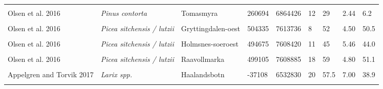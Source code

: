 \documentclass[
]{article}
\begin{document}
\begin{landscape}
\begin{longtable}[t]{l>{}llllllll}
\cellcolor{gray!6}{Olsen et al. 2016} & \em{\cellcolor{gray!6}{Pinus contorta}} & \cellcolor{gray!6}{Sollitangen} & \cellcolor{gray!6}{260896} & \cellcolor{gray!6}{6859024} & \cellcolor{gray!6}{12} & \cellcolor{gray!6}{37} & \cellcolor{gray!6}{2.60} & \cellcolor{gray!6}{6.7}\\
\addlinespace
Olsen et al. 2016 & \em{Pinus contorta} & Tomasmyra & 260694 & 6864426 & 12 & 29 & 2.44 & 6.2\\
\cellcolor{gray!6}{Olsen et al. 2016} & \em{\cellcolor{gray!6}{Picea sitchensis / lutzii}} & \cellcolor{gray!6}{Gryttingdalen-vest} & \cellcolor{gray!6}{503887} & \cellcolor{gray!6}{7613803} & \cellcolor{gray!6}{8} & \cellcolor{gray!6}{52} & \cellcolor{gray!6}{4.56} & \cellcolor{gray!6}{49.0}\\
Olsen et al. 2016 & \em{Picea sitchensis / lutzii} & Gryttingdalen-oest & 504335 & 7613736 & 8 & 52 & 4.50 & 50.5\\
\cellcolor{gray!6}{Olsen et al. 2016} & \em{\cellcolor{gray!6}{Picea sitchensis / lutzii}} & \cellcolor{gray!6}{Holmsnes-nordvest} & \cellcolor{gray!6}{493935} & \cellcolor{gray!6}{7609464} & \cellcolor{gray!6}{11} & \cellcolor{gray!6}{49} & \cellcolor{gray!6}{5.36} & \cellcolor{gray!6}{45.3}\\
Olsen et al. 2016 & \em{Picea sitchensis / lutzii} & Holmsnes-soeroest & 494675 & 7608420 & 11 & 45 & 5.46 & 44.0\\
\addlinespace
\cellcolor{gray!6}{Olsen et al. 2016} & \em{\cellcolor{gray!6}{Picea sitchensis / lutzii}} & \cellcolor{gray!6}{Hov} & \cellcolor{gray!6}{496920} & \cellcolor{gray!6}{7608739} & \cellcolor{gray!6}{11} & \cellcolor{gray!6}{56} & \cellcolor{gray!6}{5.22} & \cellcolor{gray!6}{50.9}\\
Olsen et al. 2016 & \em{Picea sitchensis / lutzii} & Raavollmarka & 499105 & 7608885 & 18 & 59 & 4.80 & 51.1\\
\cellcolor{gray!6}{Appelgren and Torvik 2017} & \em{\cellcolor{gray!6}{Larix spp.}} & \cellcolor{gray!6}{Anisdal} & \cellcolor{gray!6}{-36439} & \cellcolor{gray!6}{6529890} & \cellcolor{gray!6}{22} & \cellcolor{gray!6}{56} & \cellcolor{gray!6}{7.37} & \cellcolor{gray!6}{38.8}\\
Appelgren and Torvik 2017 & \em{Larix spp.} & Haalandsbotn & -37108 & 6532830 & 20 & 57.5 & 7.00 & 38.9\\
\cellcolor{gray!6}{Appelgren and Torvik 2017} & \em{\cellcolor{gray!6}{Larix spp.}} & \cellcolor{gray!6}{Roeynaasen} & \cellcolor{gray!6}{-31279} & \cellcolor{gray!6}{6547997} & \cellcolor{gray!6}{25} & \cellcolor{gray!6}{77.5} & \cellcolor{gray!6}{6.88} & \cellcolor{gray!6}{36.5}\\

\end{longtable}
\end{landscape}
\end{document}

